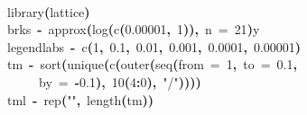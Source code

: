 \documentclass[a4paper]{article}
\newcommand{\hlnumber}[1]{\textcolor[rgb]{0.0823529411764706,0.0784313725490196,0.709803921568627}{#1}}%
\newcommand{\hlfunctioncall}[1]{\textcolor[rgb]{1,0,0}{#1}}%
\newcommand{\hlstring}[1]{\textcolor[rgb]{0.6,0.6,1}{#1}}%
\newcommand{\hlkeyword}[1]{\textcolor[rgb]{0,0,0}{\textbf{#1}}}%
\newcommand{\hlargument}[1]{\textcolor[rgb]{0.694117647058824,0.247058823529412,0.0196078431372549}{#1}}%
\newcommand{\hlassignement}[1]{\textcolor[rgb]{0.215686274509804,0.215686274509804,0.384313725490196}{\textbf{#1}}}%
\newcommand{\hlsymbol}[1]{\textcolor[rgb]{0,0,0}{#1}}%
\newcommand{\hlprompt}[1]{\textcolor[rgb]{0,0,0}{#1}}%
\newcommand{\hlstd}[1]{\textcolor[rgb]{0,0,0}{#1}}%
\newenvironment{Houtput}{\raggedright}{%
%
}
\begin{document}
\begin{Houtput}
\hspace*{\fill}\\
\hlstd{}\ttfamily\noindent
\hlprompt{\usebox{\hlnormalsizeboxgreaterthan}{\ }}\hlfunctioncall{library}\hlkeyword{(}\hlsymbol{lattice}\hlkeyword{)}\mbox{}
\normalfont
\hspace*{\fill}\\
\hlstd{}\ttfamily\noindent
\hlprompt{\usebox{\hlnormalsizeboxgreaterthan}{\ }}\hlsymbol{brks}{\ }\hlassignement{\usebox{\hlnormalsizeboxlessthan}-}{\ }\hlfunctioncall{approx}\hlkeyword{(}\hlfunctioncall{log}\hlkeyword{(}\hlfunctioncall{c}\hlkeyword{(}\hlnumber{0.00001}\hlkeyword{,}{\ }\hlnumber{1}\hlkeyword{)}\hlkeyword{)}\hlkeyword{,}{\ }\hlargument{n}{\ }\hlargument{=}{\ }\hlnumber{21}\hlkeyword{)}\hlkeyword{\usebox{\hlnormalsizeboxdollar}}\hlsymbol{y}\mbox{}
\normalfont
\hspace*{\fill}\\
\hlstd{}\ttfamily\noindent
\hlprompt{\usebox{\hlnormalsizeboxgreaterthan}{\ }}\hlsymbol{legendlabs}{\ }\hlassignement{\usebox{\hlnormalsizeboxlessthan}-}{\ }\hlfunctioncall{c}\hlkeyword{(}\hlnumber{1}\hlkeyword{,}{\ }\hlnumber{0.1}\hlkeyword{,}{\ }\hlnumber{0.01}\hlkeyword{,}{\ }\hlnumber{0.001}\hlkeyword{,}{\ }\hlnumber{0.0001}\hlkeyword{,}{\ }\hlnumber{0.00001}\hlkeyword{)}\mbox{}
\normalfont
\hspace*{\fill}\\
\hlstd{}\ttfamily\noindent
\hlprompt{\usebox{\hlnormalsizeboxgreaterthan}{\ }}\hlsymbol{tm}{\ }\hlassignement{\usebox{\hlnormalsizeboxlessthan}-}{\ }\hlfunctioncall{sort}\hlkeyword{(}\hlfunctioncall{unique}\hlkeyword{(}\hlfunctioncall{c}\hlkeyword{(}\hlfunctioncall{outer}\hlkeyword{(}\hlfunctioncall{seq}\hlkeyword{(}\hlargument{from}{\ }\hlargument{=}{\ }\hlnumber{1}\hlkeyword{,}{\ }\hlargument{to}{\ }\hlargument{=}{\ }\hlnumber{0.1}\hlkeyword{,}\hspace*{\fill}\\
\hlstd{}\hlprompt{{\ }}{\ }{\ }{\ }{\ }\hlargument{by}{\ }\hlargument{=}{\ }\hlkeyword{-}\hlnumber{0.1}\hlkeyword{)}\hlkeyword{,}{\ }\hlnumber{10}\hlkeyword{\usebox{\hlnormalsizeboxhat}}\hlkeyword{(}\hlnumber{4}\hlkeyword{:}\hlnumber{0}\hlkeyword{)}\hlkeyword{,}{\ }\hlstring{"/"}\hlkeyword{)}\hlkeyword{)}\hlkeyword{)}\hlkeyword{)}\mbox{}
\normalfont
\hspace*{\fill}\\
\hlstd{}\ttfamily\noindent
\hlprompt{\usebox{\hlnormalsizeboxgreaterthan}{\ }}\hlsymbol{tml}{\ }\hlassignement{\usebox{\hlnormalsizeboxlessthan}-}{\ }\hlfunctioncall{rep}\hlkeyword{(}\hlstring{""}\hlkeyword{,}{\ }\hlfunctioncall{length}\hlkeyword{(}\hlsymbol{tm}\hlkeyword{)}\hlkeyword{)}\mbox{}

\end{Houtput}
\end{document}
